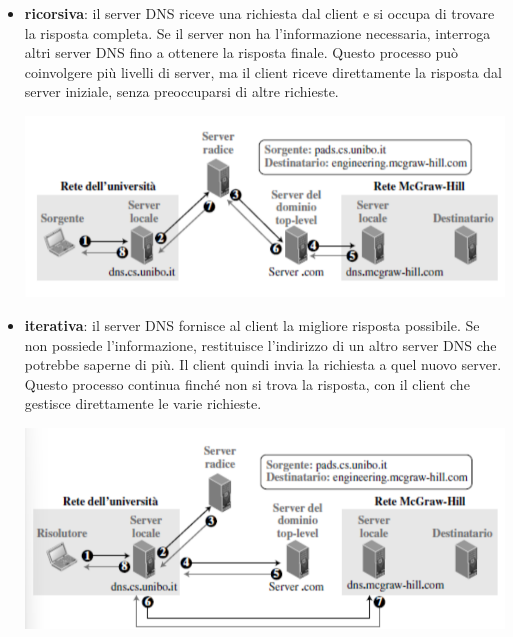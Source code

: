 \documentclass[12pt]{report}
\begin{document}
	\begin{itemize}
		\item \textbf{ricorsiva}: il server DNS riceve una richiesta dal client e si occupa di trovare la risposta completa. Se il server non ha l'informazione necessaria, interroga altri server DNS fino a ottenere la risposta finale. Questo processo può coinvolgere più livelli di server, ma il client riceve direttamente la risposta dal server iniziale, senza preoccuparsi di altre richieste.
		\begin{center}
			\includegraphics[scale=0.5]{assets/dns-rec.png}
		\end{center}
		\item \textbf{iterativa}:  il server DNS fornisce al client la migliore risposta possibile. Se non possiede l'informazione, restituisce l'indirizzo di un altro server DNS che potrebbe saperne di più. Il client quindi invia la richiesta a quel nuovo server. Questo processo continua finché non si trova la risposta, con il client che gestisce direttamente le varie richieste.
		\begin{center}
			\includegraphics[scale=0.5]{assets/dns-iter.png}
		\end{center}
	\end{itemize}
\end{document}

